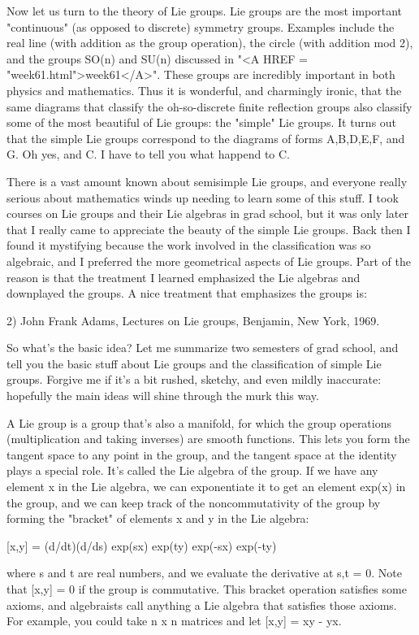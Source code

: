 Now let us turn to the theory of Lie groups.  Lie groups are the most
important "continuous" (as opposed to discrete) symmetry
groups.  Examples include the real line (with addition as the group
operation), the circle (with addition mod 2\pi ), and the groups SO(n)
and SU(n) discussed in "<A HREF = "week61.html">week61</A>".
These groups are incredibly important in both physics and mathematics.
Thus it is wonderful, and charmingly ironic, that the same diagrams
that classify the oh-so-discrete finite reflection groups also
classify some of the most beautiful of Lie groups: the
"simple" Lie groups.  It turns out that the simple Lie
groups correspond to the diagrams of forms A,B,D,E,F, and G.  Oh yes,
and C.  I have to tell you what happend to C.

There is a vast amount known about semisimple Lie groups, and everyone
really serious about mathematics winds up needing to learn some of this
stuff.  I took courses on Lie groups and their Lie algebras in grad
school, but it was only later that I really came to appreciate the
beauty of the simple Lie groups.  Back then I found it mystifying
because the work involved in the classification was so algebraic, 
and I preferred the more geometrical aspects of Lie groups.  Part of the
reason is that the treatment I learned emphasized the Lie algebras and
downplayed the groups.  A nice treatment that emphasizes the groups is:

2) John Frank Adams, Lectures on Lie groups, Benjamin, New York, 1969.

So what's the basic idea?  Let me summarize two semesters of grad
school, and tell you the basic stuff about Lie groups and the
classification of simple Lie groups.  Forgive me if it's a bit rushed,
sketchy, and even mildly inaccurate: hopefully the main ideas will shine
through the murk this way.

A Lie group is a group that's also a manifold, for which the group
operations (multiplication and taking inverses) are smooth functions.
This lets you form the tangent space to any point in the group, and
the tangent space at the identity plays a special role.  It's called
the Lie algebra of the group.  If we have any element x in the Lie
algebra, we can exponentiate it to get an element exp(x) in the group,
and we can keep track of the noncommutativity of the group by forming
the "bracket" of elements x and y in the Lie algebra:

[x,y] = (d/dt)(d/ds) exp(sx) exp(ty) exp(-sx) exp(-ty) 

where s and t are real numbers, and we evaluate the derivative at s,t
= 0.  Note that [x,y] = 0 if the group is commutative.  This bracket
operation satisfies some axioms, and algebraists call anything a Lie
algebra that satisfies those axioms.  For example, you could take n x
n matrices and let [x,y] = xy - yx.

